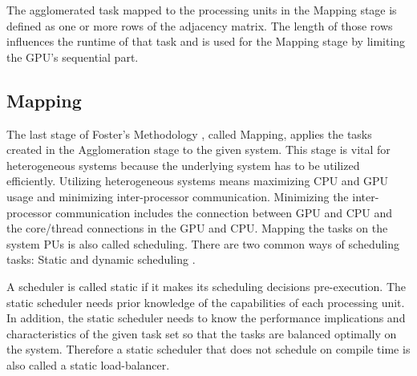 The agglomerated task mapped to the processing units in the Mapping stage is defined as one or more rows of the adjacency matrix. The length of those rows influences the runtime of that task and is used for the Mapping stage by limiting the GPU's sequential part.

 

\subsection{Mapping}
The last stage of Foster's Methodology \cite{fosterDesigningBuildingParallel1995}, called Mapping, applies the tasks created in the Agglomeration stage to the given system. This stage is vital for heterogeneous systems because the underlying system has to be utilized efficiently. Utilizing heterogeneous systems means maximizing CPU and GPU usage and minimizing inter-processor communication. Minimizing the inter-processor communication includes the connection between GPU and CPU and the core/thread connections in the GPU and CPU.
Mapping the tasks on the system PUs is also called scheduling. There are two common ways of scheduling tasks: Static and dynamic scheduling \cite{kopetzRealTimeScheduling1997}.

A scheduler is called static if it makes its scheduling decisions pre-execution. The static scheduler needs prior knowledge of the capabilities of each processing unit. In addition, the static scheduler needs to know the performance implications and characteristics of the given task set so that the tasks are balanced optimally on the system. Therefore a static scheduler that does not schedule on compile time is also called a static load-balancer.


